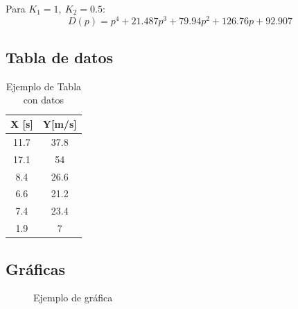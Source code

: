 \documentclass[article, 11pt]{IEEEtran}   %
\begin{document}
Para $K_1=1,\ K_2=0.5$:
\begin{equation*}
D(p)=p^4+21.487p^3+79.94p^2+126.76p+92.907
\end{equation*}


\subsection{Tabla de datos}
\begin{table}[H]
\centering
\caption{Ejemplo de Tabla con datos}
\label{DataTable1}
\begin{tabular}{|c|c|}
\hline
X [s] & Y[m/s]  \\
\hline
11.7 & 37.8              \\
17.1 & 54     \\  
8.4 & 26.6 \\
6.6 & 21.2 \\
7.4 & 23.4 \\
1.9 & 7   \\
\hline   
\end{tabular}
\end{table}

\subsection{Gr\'aficas}
\begin{figure}[H]
	\centering
	\caption{Ejemplo de gr\'afica}\label{diagram1}   %
\end{figure}


\end{document}
